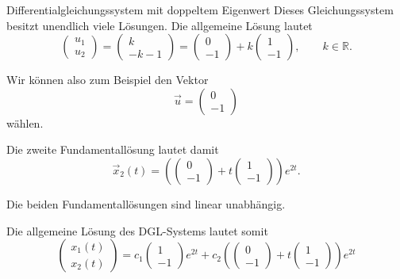 \begin{bsp}{Differentialgleichungssystem mit doppeltem Eigenwert}{}
    Dieses Gleichungssystem besitzt unendlich viele Lösungen.
    Die allgemeine Lösung lautet
    \[
        \begin{pmatrix}
            u_1 \\u_2
        \end{pmatrix}
        =
        \begin{pmatrix}
            k \\-k-1
        \end{pmatrix}
        =
        \begin{pmatrix}
            0 \\-1
        \end{pmatrix}
        +
        k\begin{pmatrix}
            1 \\-1
        \end{pmatrix},
        \qquad k\in\mathbb{R}.
    \]

    Wir können also zum Beispiel den Vektor
    \[
        \vec{u}=\begin{pmatrix}0\\-1\end{pmatrix}
    \]
    wählen.

    Die zweite Fundamentallösung lautet damit
    \[
        \vec{x}_2(t)
        =
        \left(
        \begin{pmatrix}0\\-1\end{pmatrix}
        +
        t\begin{pmatrix}1\\-1\end{pmatrix}
        \right)e^{2t}.
    \]

    Die beiden Fundamentallösungen sind linear unabhängig.

    Die allgemeine Lösung des DGL-Systems lautet somit
    \[
        \boxed{
            \begin{pmatrix}
                x_1(t) \\x_2(t)
            \end{pmatrix}
            =
            c_1\begin{pmatrix}1\\-1\end{pmatrix}e^{2t}
            +
            c_2\left(
            \begin{pmatrix}0\\-1\end{pmatrix}
            +
            t\begin{pmatrix}1\\-1\end{pmatrix}
            \right)e^{2t}
        }
    \]

\end{bsp}

